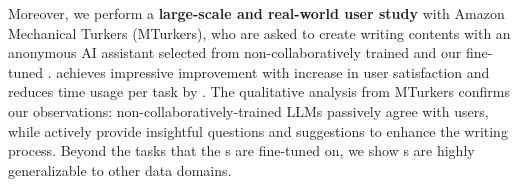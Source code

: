 Moreover, we perform a \textbf{large-scale and real-world user study} with \numturker{} Amazon Mechanical Turkers (MTurkers), who are asked to create writing contents with an anonymous AI assistant selected from non-collaboratively trained and our fine-tuned \name{}. \name{} achieves impressive improvement with \realsatisfyimprov increase in user satisfaction and reduces time usage per task by \realtimeimprov{}. The qualitative analysis from MTurkers confirms our observations: non-collaboratively-trained LLMs passively agree with users, while \name{} actively provide insightful questions and suggestions to enhance the writing process. 
Beyond the tasks that the \name{}s are fine-tuned on, we show \name{}s are highly generalizable to other data domains. 

\begin{comment}
To summarize our contributions:
%
\begin{itemize}
    \item We introduce a novel and plug-and-play training framework for improving LLM interactivity in real-world collaboration with humans, which can be easily integrated into RL training frameworks like DPO.
    
    \item We propose a multiturn-aware reward mechanism that encourages forward-looking responses, enabling LLMs to guide conversations toward effective, long-term collaboration.
    
    \item We demonstrate the effectiveness of our approach on three multiturn tasks, achieving significant improvements in task-specific metrics, interactivity, and efficiency over tche baselines. Moreover, extensive ablation and case studies provide insights to understand the behaviors of \objectst.
\end{itemize}
\end{comment}



